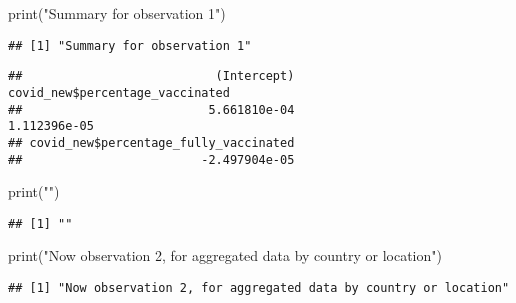\documentclass[
  12pt,
]{article}
\newenvironment{Shaded}{\begin{snugshade}}{\end{snugshade}}
\newcommand{\FunctionTok}[1]{\textcolor[rgb]{0.00,0.00,0.00}{#1}}
\newcommand{\NormalTok}[1]{#1}
\newcommand{\OtherTok}[1]{\textcolor[rgb]{0.56,0.35,0.01}{#1}}
\newcommand{\SpecialCharTok}[1]{\textcolor[rgb]{0.00,0.00,0.00}{#1}}
\newcommand{\StringTok}[1]{\textcolor[rgb]{0.31,0.60,0.02}{#1}}
\begin{document}
\begin{Shaded}
\begin{Highlighting}[]
\FunctionTok{print}\NormalTok{(}\StringTok{"Summary for observation 1"}\NormalTok{)}
\end{Highlighting}
\end{Shaded}

\begin{verbatim}
## [1] "Summary for observation 1"
\end{verbatim}

\begin{Shaded}
\end{Shaded}

\begin{verbatim}
##                           (Intercept)       covid_new$percentage_vaccinated 
##                          5.661810e-04                          1.112396e-05 
## covid_new$percentage_fully_vaccinated 
##                         -2.497904e-05
\end{verbatim}

\begin{Shaded}
\begin{Highlighting}[]
\FunctionTok{print}\NormalTok{(}\StringTok{""}\NormalTok{)}
\end{Highlighting}
\end{Shaded}

\begin{verbatim}
## [1] ""
\end{verbatim}

\begin{Shaded}
\begin{Highlighting}[]
\FunctionTok{print}\NormalTok{(}\StringTok{"Now observation 2, for aggregated data by country or location"}\NormalTok{)}
\end{Highlighting}
\end{Shaded}

\begin{verbatim}
## [1] "Now observation 2, for aggregated data by country or location"
\end{verbatim}
\end{document}
